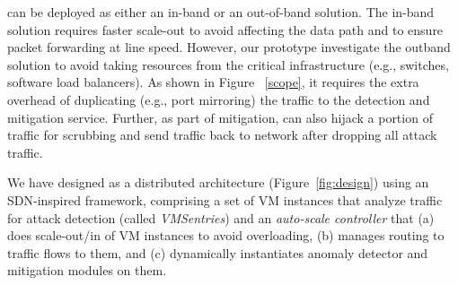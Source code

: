 \nimbus can be deployed as either an in-band or an out-of-band
solution. The in-band solution requires faster scale-out to avoid affecting the data path and to ensure packet forwarding at line speed.
However, our prototype investigate the outband solution to avoid taking resources from the critical infrastructure (e.g., switches, software load balancers). 
As shown in Figure ~\ref{scope}, it requires the extra overhead of duplicating (e.g., port mirroring) the traffic to the detection and mitigation service. Further, as part of mitigation, \nimbus can also hijack a portion of traffic for scrubbing and send traffic back to network after dropping all attack traffic.



We have designed \nimbus as a distributed architecture
(Figure~\ref{fig:design}) 
using an SDN-inspired framework, 
comprising a set of VM instances that analyze traffic for attack detection  
(called \emph{VMSentries}) and an \emph{auto-scale controller}
that (a) does scale-out/in of VM instances to avoid overloading,
(b) manages routing to traffic flows to them, and 
(c) dynamically instantiates anomaly detector and mitigation modules on them.

